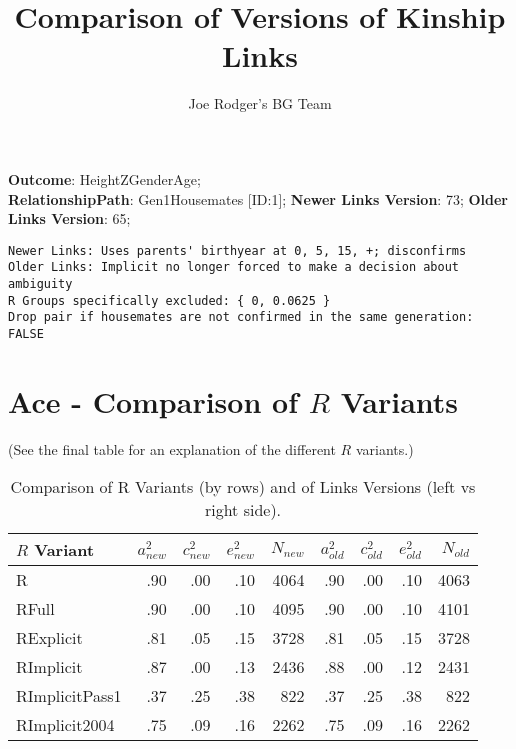 \documentclass{article}\usepackage{graphicx, color}
\title{Comparison of Versions of Kinship Links}
\author{Joe Rodger's BG Team}
\makeatletter
\newenvironment{kframe}{%
 \def\at@end@of@kframe{}%
 \ifinner\ifhmode%
  \def\at@end@of@kframe{\end{minipage}}%
  \begin{minipage}{\columnwidth}%
 \fi\fi%
 \def\FrameCommand##1{\hskip\@totalleftmargin \hskip-\fboxsep
 \colorbox{shadecolor}{##1}\hskip-\fboxsep
     \hskip-\linewidth \hskip-\@totalleftmargin \hskip\columnwidth}%
 \MakeFramed {\advance\hsize-\width
   \@totalleftmargin\z@ \linewidth\hsize
   \@setminipage}}%
 {\par\unskip\endMakeFramed%
 \at@end@of@kframe}
\newenvironment{knitrout}{}{} %
\makeatother
\begin{document}
\maketitle
\setcounter{totalnumber}{8} %

\setlength{\parindent}{0pt}%







\textbf{Outcome}: HeightZGenderAge;\\
\textbf{RelationshipPath}: Gen1Housemates [ID:1];
\textbf{Newer Links Version}: 73;
\textbf{Older Links Version}: 65;

\begin{knitrout}
\color{fgcolor}\begin{kframe}
\begin{verbatim}
Newer Links: Uses parents' birthyear at 0, 5, 15, +; disconfirms
Older Links: Implicit no longer forced to make a decision about ambiguity
R Groups specifically excluded: { 0, 0.0625 }
Drop pair if housemates are not confirmed in the same generation: FALSE
\end{verbatim}
\end{kframe}
\end{knitrout}





\section{Ace - Comparison of $R$ Variants} 
(See the final table for an explanation of the different $R$ variants.)
\begin{table}[ht]
\centering
{\large
\begin{tabular}{l|rrrr|rrrr}
  \hline
$R$ Variant & $a_{new}^2$ & $c_{new}^2$ & $e_{new}^2$ & $N_{new}$ & $a_{old}^2$ & $c_{old}^2$ & $e_{old}^2$ & $N_{old}$ \\ 
  \hline
R & .90 & .00 & .10 & 4064 & .90 & .00 & .10 & 4063 \\ 
  RFull & .90 & .00 & .10 & 4095 & .90 & .00 & .10 & 4101 \\ 
  RExplicit & .81 & .05 & .15 & 3728 & .81 & .05 & .15 & 3728 \\ 
  RImplicit & .87 & .00 & .13 & 2436 & .88 & .00 & .12 & 2431 \\ 
  RImplicitPass1 & .37 & .25 & .38 &  822 & .37 & .25 & .38 &  822 \\ 
  RImplicit2004 & .75 & .09 & .16 & 2262 & .75 & .09 & .16 & 2262 \\ 
   \hline
\end{tabular}
}
\caption{Comparison of R Variants (by rows) and of Links Versions (left vs right side).} 
\end{table}
\end{document}
